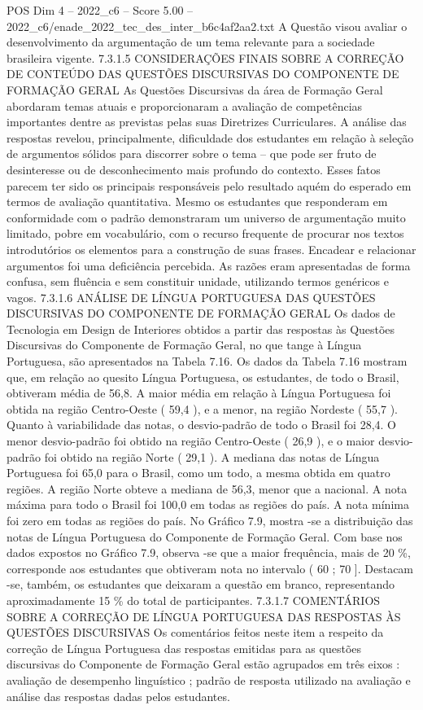 \begin{textsample}{POS Dim 4 – 2022\_c6 – Score 5.00 – 2022\_c6/enade\_2022\_tec\_des\_inter\_b6c4af2aa2.txt}
A Questão visou avaliar o desenvolvimento da argumentação de um tema relevante para a sociedade brasileira vigente. 7.3.1.5 CONSIDERAÇÕES FINAIS SOBRE A CORREÇÃO DE CONTEÚDO DAS QUESTÕES DISCURSIVAS DO COMPONENTE DE FORMAÇÃO GERAL As Questões Discursivas da área de Formação Geral abordaram temas atuais e proporcionaram a avaliação de competências importantes dentre as previstas pelas suas Diretrizes Curriculares.
A análise das respostas revelou, principalmente, dificuldade dos estudantes em relação à seleção de argumentos sólidos para discorrer sobre o tema – que pode ser fruto de desinteresse ou de desconhecimento mais profundo do contexto.
Esses fatos parecem ter sido os principais responsáveis pelo resultado aquém do esperado em termos de avaliação quantitativa.
Mesmo os estudantes que responderam em conformidade com o padrão demonstraram um universo de argumentação muito limitado, pobre em vocabulário, com o recurso frequente de procurar nos textos introdutórios os elementos para a construção de suas frases.
Encadear e relacionar argumentos foi uma deficiência percebida.
As razões eram apresentadas de forma confusa, sem fluência e sem constituir unidade, utilizando termos genéricos e vagos. 7.3.1.6 ANÁLISE DE LÍNGUA PORTUGUESA DAS QUESTÕES DISCURSIVAS DO COMPONENTE DE FORMAÇÃO GERAL Os dados de Tecnologia em Design de Interiores obtidos a partir das respostas às Questões Discursivas do Componente de Formação Geral, no que tange à Língua Portuguesa, são apresentados na Tabela 7.16.
Os dados da Tabela 7.16 mostram que, em relação ao quesito Língua Portuguesa, os estudantes, de todo o Brasil, obtiveram média de 56,8.
A maior média em relação à Língua Portuguesa foi obtida na região Centro-Oeste ( 59,4 ), e a menor, na região Nordeste ( 55,7 ).
Quanto à variabilidade das notas, o desvio-padrão de todo o Brasil foi 28,4.
O menor desvio-padrão foi obtido na região Centro-Oeste ( 26,9 ), e o maior desvio-padrão foi obtido na região Norte ( 29,1 ).
A mediana das notas de Língua Portuguesa foi 65,0 para o Brasil, como um todo, a mesma obtida em quatro regiões.
A região Norte obteve a mediana de 56,3, menor que a nacional.
A nota máxima para todo o Brasil foi 100,0 em todas as regiões do país.
A nota mínima foi zero em todas as regiões do país.
No Gráfico 7.9, mostra -se a distribuição das notas de Língua Portuguesa do Componente de Formação Geral.
Com base nos dados expostos no Gráfico 7.9, observa -se que a maior frequência, mais de 20 \%, corresponde aos estudantes que obtiveram nota no intervalo ( 60 ; 70 ].
Destacam -se, também, os estudantes que deixaram a questão em branco, representando aproximadamente 15 \% do total de participantes. 7.3.1.7 COMENTÁRIOS SOBRE A CORREÇÃO DE LÍNGUA PORTUGUESA DAS RESPOSTAS ÀS QUESTÕES DISCURSIVAS Os comentários feitos neste item a respeito da correção de Língua Portuguesa das respostas emitidas para as questões discursivas do Componente de Formação Geral estão agrupados em três eixos : avaliação de desempenho linguístico ; padrão de resposta utilizado na avaliação e análise das respostas dadas pelos estudantes.

\end{textsample}
